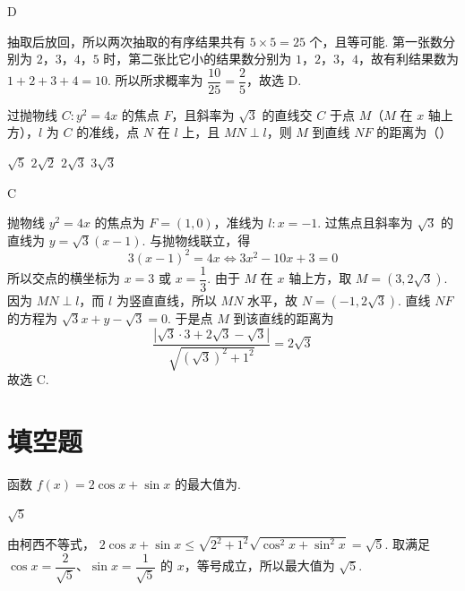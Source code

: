 \begin{answer}
D
\end{answer}

\begin{solution}
抽取后放回，所以两次抽取的有序结果共有 \(5\times5=25\) 个，且等可能.
第一张数分别为 \(2\)，\(3\)，\(4\)，\(5\) 时，第二张比它小的结果数分别为 \(1\)，\(2\)，\(3\)，\(4\)，故有利结果数为
\(1+2+3+4=10\).
所以所求概率为 \(\dfrac{10}{25}=\dfrac25\)，故选 D.
\end{solution}

\begin{problem}
过抛物线 \(C:y^2=4x\) 的焦点 \(F\)，且斜率为 \(\sqrt3\) 的直线交 \(C\) 于点 \(M\)（\(M\) 在 \(x\) 轴上方），\(l\) 为 \(C\) 的准线，点 \(N\) 在 \(l\) 上，且 \(MN\perp l\)，则 \(M\) 到直线 \(NF\) 的距离为（\quad）

\choices
    {\(\sqrt5\)}
    {\(2\sqrt2\)}
    {\(2\sqrt3\)}
    {\(3\sqrt3\)}
\end{problem}

\begin{answer}
C
\end{answer}

\begin{solution}
抛物线 \(y^2=4x\) 的焦点为 \(F=(1,0)\)，准线为 \(l:x=-1\).
过焦点且斜率为 \(\sqrt3\) 的直线为 \(y=\sqrt3(x-1)\). 与抛物线联立，得
\[
3(x-1)^2=4x\Longleftrightarrow 3x^2-10x+3=0
\]
所以交点的横坐标为 \(x=3\) 或 \(x=\dfrac13\). 由于 \(M\) 在 \(x\) 轴上方，取 \(M=(3,2\sqrt3)\).
因为 \(MN\perp l\)，而 \(l\) 为竖直直线，所以 \(MN\) 水平，故 \(N=(-1,2\sqrt3)\). 直线 \(NF\) 的方程为
\(\sqrt3x+y-\sqrt3=0\).
于是点 \(M\) 到该直线的距离为
\[
\frac{|\sqrt3\cdot3+2\sqrt3-\sqrt3|}{\sqrt{(\sqrt3)^2+1^2}}=2\sqrt3
\]
故选 C.
\end{solution}

\section{填空题}

\begin{problem}
函数 \(f(x)=2\cos x+\sin x\) 的最大值为\fillinblank{}.
\end{problem}

\begin{answer}
\(\sqrt5\)
\end{answer}

\begin{solution}
由柯西不等式，
\(2\cos x+\sin x\le\sqrt{2^2+1^2}\sqrt{\cos^2x+\sin^2x}=\sqrt5\).
取满足 \(\cos x=\dfrac2{\sqrt5}\)、\(\sin x=\dfrac1{\sqrt5}\) 的 \(x\)，等号成立，所以最大值为 \(\sqrt5\).
\end{solution}

